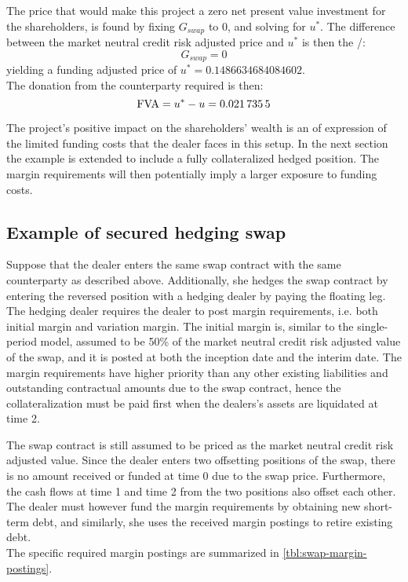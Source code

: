 \documentclass[main.tex]{subfiles}
\begin{document}
            The price that would make this project a zero net present value investment for the shareholders,
            is found by fixing $G_{swap}$ to 0,
            and solving for $u^{\ast}$.
            The difference between the market neutral credit risk adjusted price and $u^{\ast}$ is then the \FVA/:
            \begin{equation}
                G_{swap} = 0
            \end{equation}
            yielding a funding adjusted price of $u^{\ast} = \num{0.1486634684084602}$.
            \\
            The donation from the counterparty required is then:
            \begin{equation}
                \FVA/ = u^{\ast} - u = \num{0.0217355}
            \end{equation}

            The project's positive impact on the shareholders' wealth is an of expression of the limited funding costs
            that the dealer faces in this setup.
            In the next section the example is extended to include a fully collateralized hedged position.
            The margin requirements will then potentially imply a larger exposure to funding costs.

        \subsection{Example of secured hedging swap}
            Suppose that the dealer enters the same swap contract with the same counterparty as described above.
            Additionally, she hedges the swap contract by entering the reversed position with a hedging dealer
            by paying the floating leg.
            The hedging dealer requires the dealer to post margin requirements,
            i.e. both initial margin and variation margin.
            The initial margin is,
            similar to the single-period model,
            assumed to be 50\% of the market neutral credit risk adjusted value of the swap,
            and it is posted at both the inception date and the interim date.
            The margin requirements have higher priority than any other existing liabilities and outstanding contractual amounts due to the swap contract,
            hence the collateralization must be paid first when the dealers's assets are liquidated at time 2.

            The swap contract is still assumed to be priced as the market neutral credit risk adjusted value.
            Since the dealer enters two offsetting positions of the swap,
            there is no amount received or funded at time 0 due to the swap price.
            Furthermore, the cash flows at time 1 and time 2 from the two positions also offset each other.
            The dealer must however fund the margin requirements by obtaining new short-term debt,
            and similarly, she uses the received margin postings to retire existing debt.
            \\
            The specific required margin postings are summarized in \cref{tbl:swap-margin-postings}.
\end{document}
